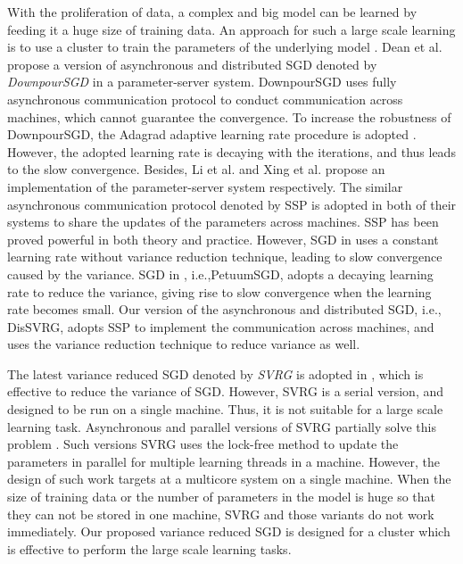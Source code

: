 \documentclass[10pt,journal,finalsubmission,compsoc]{IEEEtran}
\begin{document}
With the proliferation of data, a complex and big model can be learned by feeding it a huge size of training data. An approach for such a large scale learning is to use a cluster to train the parameters of the underlying model \cite{Dean:2012wx, Li:2014tt, Xing:2015ib}. Dean et al. propose a version of asynchronous and distributed SGD denoted by \emph{DownpourSGD} in a parameter-server system. DownpourSGD uses fully asynchronous communication protocol to conduct communication across machines, which cannot guarantee the convergence. To increase the robustness of DownpourSGD, the Adagrad adaptive learning rate procedure is adopted \cite{Cavalcante:2009il}. However, the adopted learning rate is decaying with the iterations, and thus leads to the slow convergence. Besides, Li et al. and Xing et al. propose an implementation of the parameter-server system respectively.  The similar asynchronous communication protocol denoted by SSP is adopted in both of their systems to share the updates of the parameters across machines. SSP has been proved powerful in both theory and practice.  However, SGD in \cite{Li:2014tt} uses a constant learning rate without variance reduction technique, leading to slow convergence caused by the variance. SGD in \cite{Xing:2015ib}, i.e.,PetuumSGD, adopts a decaying learning rate to reduce the variance, giving rise to slow convergence when the learning rate becomes small. Our version of the asynchronous and distributed SGD, i.e., DisSVRG, adopts SSP to implement the communication across machines, and uses the variance reduction technique  to reduce variance as well. 
 
The latest variance reduced SGD denoted by \emph{SVRG} is adopted in \cite{Johnson:9MAvkbgy}, which is  effective to reduce the variance of SGD. However, SVRG is a serial version, and designed to be run on a single machine. Thus, it is not suitable for a large scale learning task. Asynchronous and parallel versions of SVRG partially solve this problem \cite{Zhao:SZfxEHHg, Reddi:2015vj, Mania:2015wa, lian2015asynchronous}. Such versions SVRG uses the lock-free method to update the parameters in parallel for multiple learning threads in a machine. However, the design of such work targets at a multicore system on a single machine. When the size of training data or the number of parameters in the model is huge so that they can not be stored in one machine, SVRG and those variants do not work immediately. Our proposed variance reduced SGD is designed for a cluster which is effective to perform the large scale learning tasks. 
\end{document}
